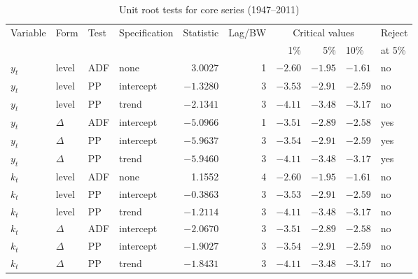 \begin{longtable}[t]{llllrrrrll}
\caption{Unit root tests for core series (1947--2011)}\label{tab:app_unit_roots}\\
\toprule
Variable & Form & Test & Specification & Statistic & Lag/BW & \multicolumn{3}{c}{Critical values} & Reject \\
\cmidrule(lr){7-9}
& & & & & & 1\% & 5\% & 10\% & at 5\% \\
\midrule
$y_t$ & level & ADF & none & 3.0027 & 1 & $-2.60$ & $-1.95$ & $-1.61$ & no \\
$y_t$ & level & PP & intercept & $-1.3280$ & 3 & $-3.53$ & $-2.91$ & $-2.59$ & no \\
$y_t$ & level & PP & trend & $-2.1341$ & 3 & $-4.11$ & $-3.48$ & $-3.17$ & no \\
$y_t$ & $\Delta$ & ADF & intercept & $-5.0966$ & 1 & $-3.51$ & $-2.89$ & $-2.58$ & yes \\
$y_t$ & $\Delta$ & PP & intercept & $-5.9637$ & 3 & $-3.54$ & $-2.91$ & $-2.59$ & yes \\
$y_t$ & $\Delta$ & PP & trend & $-5.9460$ & 3 & $-4.11$ & $-3.48$ & $-3.17$ & yes \\
\addlinespace
$k_t$ & level & ADF & none & 1.1552 & 4 & $-2.60$ & $-1.95$ & $-1.61$ & no \\
$k_t$ & level & PP & intercept & $-0.3863$ & 3 & $-3.53$ & $-2.91$ & $-2.59$ & no \\
$k_t$ & level & PP & trend & $-1.2114$ & 3 & $-4.11$ & $-3.48$ & $-3.17$ & no \\
$k_t$ & $\Delta$ & ADF & intercept & $-2.0670$ & 3 & $-3.51$ & $-2.89$ & $-2.58$ & no \\
$k_t$ & $\Delta$ & PP & intercept & $-1.9027$ & 3 & $-3.54$ & $-2.91$ & $-2.59$ & no \\
$k_t$ & $\Delta$ & PP & trend & $-1.8431$ & 3 & $-4.11$ & $-3.48$ & $-3.17$ & no \\
\bottomrule
\end{longtable}
